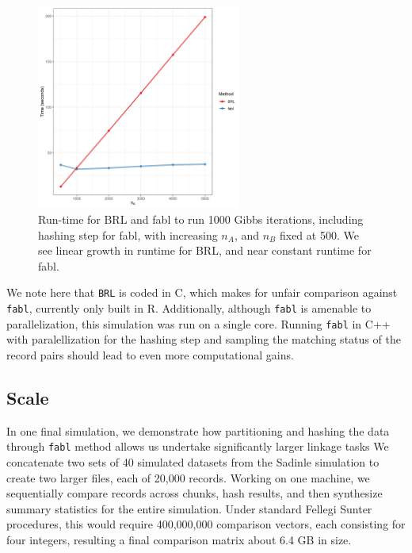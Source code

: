 \documentclass[12pt,letterpaper]{article}
\newcommand{\1}[1]{\mathbb{I}\!\left[#1\right]} %
\begin{document}
\begin{figure}[t]
	
	{\centering \includegraphics[width=0.6\textwidth]{../notes/figures/speed_plot_fixed_nB} 
		
	}
	
	\caption{Run-time for BRL and fabl to run 1000 Gibbs iterations, including hashing step for fabl, with increasing $n_A$, and $n_B$ fixed at 500. We see linear growth in runtime for BRL, and near constant runtime for fabl.}\label{fig:speed2}
\end{figure}

We note here that \texttt{BRL} is coded in C, which makes for unfair
comparison against \texttt{fabl}, currently only built in R.
Additionally, although \texttt{fabl} is amenable to parallelization,
this simulation was run on a single core. Running \texttt{fabl} in C++
with paralellization for the hashing step and sampling the matching
status of the record pairs should lead to even more computational gains.

\hypertarget{scale}{%
	\subsection{Scale}\label{scale}}

 
 In one final simulation, we demonstrate how partitioning and hashing the data through \texttt{fabl} method allows us undertake significantly larger linkage tasks We concatenate two sets of 40 simulated datasets from the Sadinle simulation to create two larger files, each of 20,000 records. Working on one machine, we sequentially compare records across chunks, hash results, and then synthesize summary statistics for the entire simulation. Under standard Fellegi Sunter procedures, this would require 400,000,000 comparison vectors, each consisting for four integers, resulting a final comparison matrix about 6.4 GB in size. 
 
\end{document}
